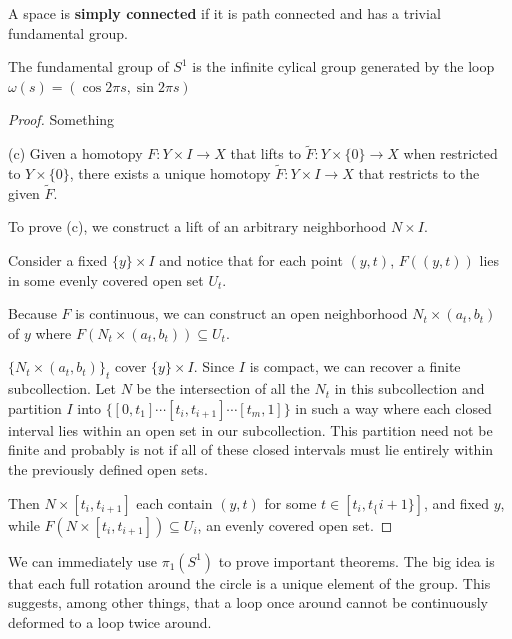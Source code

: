 \documentclass[10pt]{article}
\begin{document}
\begin{definition}
	A space is \textbf{simply connected} if it is path connected and has a trivial fundamental group.
\end{definition}


\begin{theorem}[$\Z \cong \pi_1(S^1)$]

	The fundamental group of $S^1$ is the infinite cylical group generated by the
	loop $\omega(s) = (\cos 2\pi s, \sin 2 \pi s)$
\end{theorem}

\begin{proof}

	Something

	(c) Given a homotopy $F:Y \times I \to X$ that lifts to $\tilde{F}: Y \times
	\{ 0 \} \to X$ when restricted to $Y \times \{ 0 \}$, there exists a unique
	homotopy $\tilde{F}: Y \times I \to X$ that restricts to the given $\tilde{F}$.

	To prove (c), we  construct a lift of an arbitrary neighborhood $N \times I$.

	Consider a fixed $\{y\} \times I$ and notice that for each
	point $(y, t)$,  $F((y, t))$ lies in some evenly covered open set
	$U_t$.

	Because $F$ is continuous, we can construct an open neighborhood $N_t
	\times (a_t, b_t)$ of $y$ where $F(N_t \times (a_t, b_t)) \subseteq U_t$.

	$\{ N_t \times (a_t, b_t) \}_t$ cover $\{y\} \times I$. Since $I$ is compact,
	we can recover a finite subcollection. Let $N$ be the intersection of all the $N_t$ in
	this subcollection and partition $I$ into $\{ [0, t_1] \cdots [t_i, t_{i+1}]
	\cdots [t_m, 1] \}$ in such a way where each closed interval lies within an
	open set in our subcollection. This partition need not be finite and probably
	is not if all of these closed intervals must lie entirely within the
	previously defined open sets.

	Then $N \times [t_i, t_{i+1}]$ each contain $(y, t)$ for some $t \in [t_i,
	t_\{i+1\}]$, and fixed $y$, while $F(N \times [t_i, t_{i+1}]) \subseteq U_i$,
	an evenly covered open set.

\end{proof}

We can immediately use $\pi_1(S^1)$ to prove important theorems. The big idea is that each full rotation around the circle is a unique element of the group. This suggests, among other things, that a loop once around cannot be continuously deformed to a loop twice around.
\end{document}

